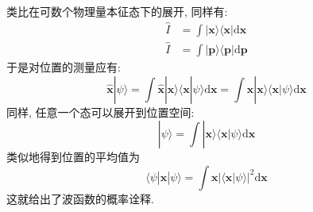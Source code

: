         类比在可数个物理量本征态下的展开, 同样有: 
        \begin{equation}
            \begin{split}
            \hat{I} &= \int |\bm{x}\rangle \langle \bm{x}| \mathrm{d}\bm{x}\\
            \hat{I} &= \int |\bm{p}\rangle \langle \bm{p}| \mathrm{d}\bm{p}
            \end{split}
        \end{equation}
        于是对位置的测量应有: 
        \begin{equation}
            \hat{\bm{x}}|\psi \rangle = \int \hat{\bm{x}}|\bm{x}\rangle \langle \bm{x}|\psi \rangle \mathrm{d}\bm{x}
            = \int \bm{x}|\bm{x}\rangle \langle \bm{x}|\psi \rangle \mathrm{d}\bm{x}
        \end{equation}
        同样, 任意一个态可以展开到位置空间: 
        \begin{equation}
            |\psi \rangle = \int |\bm{x} \rangle \langle \bm{x}|\psi\rangle \mathrm{d}\bm{x}
        \end{equation}
        类似地得到位置的平均值为
        \begin{equation}
            \langle \psi | \hat{\bm{x}} | \psi \rangle 
            = \int \bm{x} |\langle \bm{x} | \psi \rangle|^2 \mathrm{d}\bm{x}
        \end{equation}
        这就给出了波函数的概率诠释.

